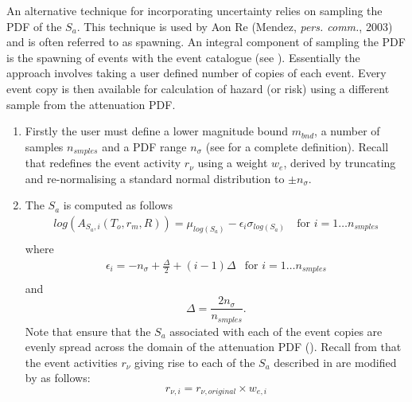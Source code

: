 An alternative technique for incorporating uncertainty relies on
sampling the PDF of the $S_a$. This technique is used by Aon Re
(Mendez, \textit{pers. comm.}, 2003) and is often referred to as
spawning. An integral component of sampling the PDF is the
spawning of events with the event catalogue (see
). Essentially the approach involves taking
a user defined number of copies of each event. Every event copy is
then available for calculation of hazard (or risk) using a
different sample from the attenuation PDF.
\begin{enumerate}
\item Firstly the user must define a lower magnitude bound
$m_{bnd}$, a number of samples $n_{smples}$ and a PDF range
$n_\sigma$ (see  for a complete definition).
Recall that  redefines the event activity
$r_\nu$ using a weight $w_e$, derived by truncating and
re-normalising a standard normal distribution to $\pm n_\sigma$.
\item The $S_a$ is computed as follows
\begin{equation}
\label{attn:uncertainty-pdfsample}
\begin{array}{ll}
log(A_{S_a,i}(T_o,r_m,R)) = \mu_{log(S_a)} - \epsilon_i
\sigma_{log(S_a)}\ & \textrm{for $i=1 \ldots
n_{smples}$} \\
\end{array}
\end{equation}
where
\begin{equation}
\label{attn:uncertainty-def-epsilon}
\begin{array}{ll}
\epsilon_i = -n_\sigma + \frac{\Delta}{2} + (i-1)\Delta &
\textrm{for $i=1 \ldots n_{smples}$} \\
\end{array}
\end{equation}
and
\begin{equation}
\Delta = \frac{2n_\sigma}{n_{smples}}.
\end{equation}
Note that
ensure that the $S_a$ associated with each of the event copies are
evenly spread across the domain of the attenuation PDF
(). Recall from 
that the event activities $r_\nu$ giving rise to each of the $S_a$
described in  are modified by
 as follows:
\begin{equation}
r_{\nu,i} = r_{\nu,original} \times w_{e,i}
\end{equation}
\end{enumerate}

